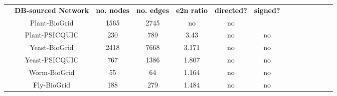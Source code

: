 \documentclass[12pt]{article}	%
\newcommand{\myPadTop}{6.5pt}
\newcommand{\myPadBottom}{4pt}
\begin{document}
            \begin{table}[H]%
                \centering
                \setlength\arrayrulewidth{.1pt}%
                \scriptsize
                    \setlength\cellspacetoplimit{\myPadTop}\setlength\cellspacebottomlimit{\myPadBottom}
                    \begin{tabular}{@{}Sc Sc|Sc|Sc|Sc|Sc|Sc@{}}
                        & \textbf{\normalsize DB-sourced Network} & \textbf{\normalsize no. nodes} & \textbf{\normalsize no. edges}	& \textbf{\normalsize e2n ratio} & \textbf{\normalsize directed? } & \textbf{\normalsize signed? } %
                            \\[.05cm] 
                                    & Plant-BioGrid  \cite{chatr-aryamontri_biogrid_2017}  & 1565      & 2745      & no & no %
                            \\[.05cm] 
                                   & Plant-PSICQUIC  \cite{aranda_psicquic_2011}         & 230       & 789       & 3.43   & no & no   %
                            \\[.05cm] 
                                    & Yeast-BioGrid  \cite{chatr-aryamontri_biogrid_2017}  & 2418      & 7668      & 3.171  & no & no    %
                            \\[.05cm] 
                                    & Yeast-PSICQUIC  \cite{aranda_psicquic_2011}        & 767       & 1386      & 1.807  & no & no    %
                            \\[.05cm] 
                                    & Worm-BioGrid  \cite{chatr-aryamontri_biogrid_2017}   & 55        & 64        & 1.164  & no & no    %
                            \\[.05cm] 
                                    & Fly-BioGrid  \cite{chatr-aryamontri_biogrid_2017}    & 188       & 279       & 1.484  & no & no    %
                            \\[.05cm] 

\end{tabular}
\end{table}
\end{document}
